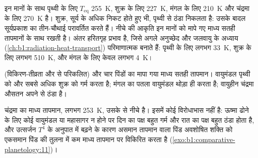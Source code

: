 इन मानों के साथ पृथ्वी के लिए $T_\mathrm{eq}$ \qty{255}{K}, शुक्र के लिए \qty{227}{K}, मंगल के लिए
\qty{210}{K} और चंद्रमा के लिए \qty{270}{K} है। शुक्र, सूर्य के अधिक निकट होते हुए भी, पृथ्वी से ठंडा
निकलता है: उसके बादल सूर्यप्रकाश का तीन-चौथाई परावर्तित करते हैं। नीचे की आकृति इन मानों को मापे
गए माध्य सतही तापमानों के साथ रखती है। अंतर हरितगृह प्रभाव है, जिसे अगले अनुच्छेद और जलवायु के
अध्याय (\cref{ch:b1:radiation-heat-transport}) परिमाणात्मक बनाते हैं: पृथ्वी के लिए लगभग \qty{33}{K},
शुक्र के लिए लगभग \qty{510}{K}, और मंगल के लिए केवल लगभग \qty{4}{K}।

\begin{omfigure}

{\small {} (विकिरण-तीव्रता और  से परिकलित) और चार पिंडों का मापा गया माध्य
सतही तापमान। वायुमंडल पृथ्वी को और सबसे अधिक शुक्र को गर्म करता है; मंगल का पतला वायुमंडल थोड़ा ही
करता है; वायुहीन चंद्रमा औसतन अपने  से ठंडा है।}
\end{omfigure}

चंद्रमा का माध्य तापमान, लगभग \qty{253}{K}, उसके  से नीचे है। इसमें कोई विरोधाभास नहीं
है: ऊष्मा ढोने के लिए कोई वायुमंडल या महासागर न होने पर दिन का पक्ष बहुत गर्म और रात का पक्ष बहुत
ठंडा होता है, और उत्सर्जन $T^4$ के अनुपात में बढ़ने के कारण असमान तापमान वाला पिंड अवशोषित शक्ति
को एकसमान पिंड की तुलना में कम माध्य तापमान पर विकिरित करता है
(\cref{exo:b1:comparative-planetology:11})।

